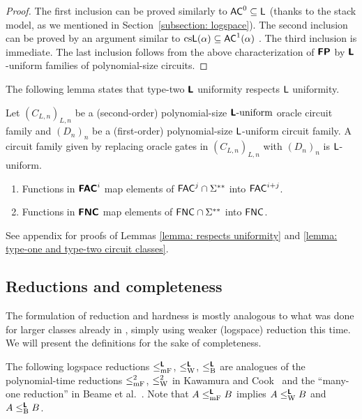\documentclass[a4paper,UKenglish]{lipics}
\begin{document}
\begin{proof}
 The first inclusion can be proved similarly
 to $\mathsf{AC}^0 \subseteq \mathsf{L}$ (thanks to the stack model, as we mentioned 
 in Section~\ref{subsection: logspace}).
 The second inclusion can be proved by an argument similar to
 $\text{cs}\mathsf{L}(\alpha) \subseteq \mathsf{AC}^1(\alpha)$
 \cite{aehlig2007relativizing}.
 The third inclusion is immediate.
 The last inclusion follows from the above characterization of $\text{\bfseries \sffamily \upshape FP}$
 by $\text{\bfseries \sffamily \upshape L}$-uniform families of polynomial-size circuits.
\end{proof}


The following lemma states that type-two $\text{\bfseries \sffamily \upshape L}$ uniformity respects
$\mathsf{L}$ uniformity.

\begin{lemma}
\label{lemma: respects uniformity}
 Let $(C_{L,n})_{L,n}$ be a (second-order) polynomial-size $\text{\bfseries \sffamily \upshape L}\text{-uniform}$ oracle circuit family
 and $(D_n)_n$ be a (first-order) polynomial-size $\mathsf{L}$-uniform circuit family.
 A circuit family given by replacing oracle gates in $(C_{L,n})_{L,n}$ with
 $(D_n)_n$ is $\mathsf{L}$-uniform.
\end{lemma}

\begin{lemma}
\label{lemma: type-one and type-two circuit classes}
\begin{enumerate}
 \item Functions in $\text{\bfseries \sffamily \upshape FAC}^i$ 
       map elements of $\mathsf{FAC}^j \cap \Sigma ^{**}$ 
       into $\mathsf{FAC}^{i+j}$.
 \item Functions in $\text{\bfseries \sffamily \upshape FNC}$
       map elements of $\mathsf{FNC} \cap \Sigma ^{**}$ 
       into $\mathsf{FNC}$.
\end{enumerate}
\end{lemma}

See appendix for proofs of 
Lemmas \ref{lemma: respects uniformity} and 
\ref{lemma: type-one and type-two circuit classes}.

\subsection{Reductions and completeness}

The formulation of reduction and hardness 
is mostly analogous to what was done for larger classes already in \cite{kawamura2012complexity}, 
simply using weaker (logspace) reduction this time. 
We will present the definitions for the sake of completeness. 

The following logspace reductions $\leq _{\mathrm{mF}} ^{\text{\bfseries \sffamily \upshape L}}$, $\leq _{\mathrm W} ^{\text{\bfseries \sffamily \upshape L}}$, $\leq _{\mathrm B} ^{\text{\bfseries \sffamily \upshape L}}$ are
analogues of the polynomial-time reductions 
$\leq _{\mathrm{mF}}^2$, $\leq _{\mathrm W}^2$ in Kawamura and Cook~\cite{kawamura2012complexity}
and the ``many-one reduction'' in Beame et al.~\cite{beame1995relative}. 
Note that $A \leq _{\mathrm{mF}} ^{\text{\bfseries \sffamily \upshape L}} B$ implies $A \leq _{\mathrm W} ^{\text{\bfseries \sffamily \upshape L}} B$ and $A \leq _{\mathrm B} ^{\text{\bfseries \sffamily \upshape L}} B$. 
\end{document}
